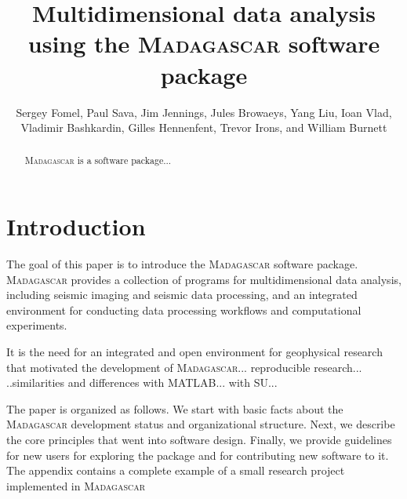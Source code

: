 \title{Multidimensional data analysis \\ using the \textsc{Madagascar} software package}

\renewcommand{\thefootnote}{\fnsymbol{footnote}} 

\author{Sergey Fomel\footnotemark[1], Paul Sava\footnotemark[2], Jim Jennings, Jules Browaeys, Yang Liu\footnotemark[1], Ioan Vlad, Vladimir Bashkardin\footnotemark[1],  Gilles Hennenfent, Trevor Irons\footnotemark[2], and William Burnett\footnotemark[1]}


\address{
\footnotemark[1]Bureau of Economic Geology, \\
John A. and Katherine G. Jackson School of Geosciences \\
The University of Texas at Austin \\
University Station, Box X \\
Austin, TX 78713-8972 \\
\footnotemark[2] Department of Geophysics \\
Colorado School of Mines \\
Golden, CO 80401}


\maketitle

\begin{abstract}
  \textsc{Madagascar} is a software package...
\end{abstract}

\section{Introduction}

The goal of this paper is to introduce the \textsc{Madagascar}
software package. \textsc{Madagascar} provides a collection of
programs for multidimensional data analysis, including seismic imaging
and seismic data processing, and an integrated environment for
conducting data processing workflows and computational experiments.

It is the need for an integrated and open environment for geophysical
research that motivated the development of
\textsc{Madagascar}... reproducible research... ..similarities and
differences with MATLAB... with SU...

The paper is organized as follows. We start with basic facts about the
\textsc{Madagascar} development status and organizational
structure. Next, we describe the core principles that went into
software design. Finally, we provide guidelines for new users for
exploring the package and for contributing new software to it. The
appendix contains a complete example of a small research project
implemented in \textsc{Madagascar}

